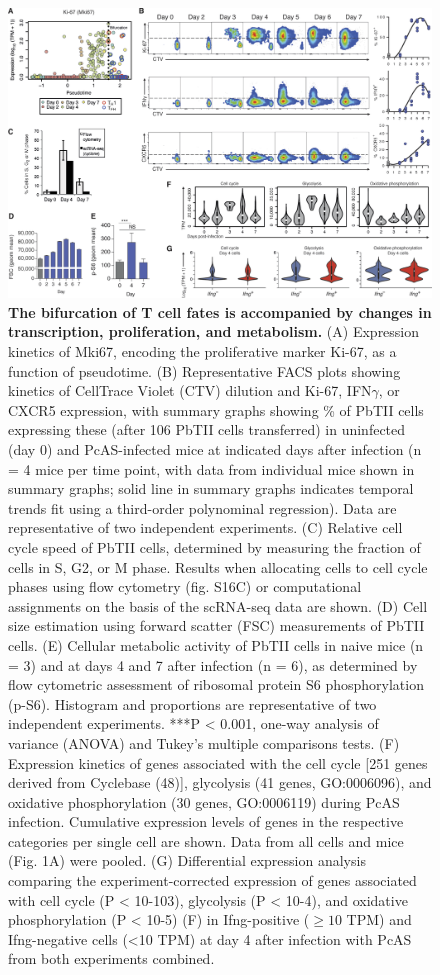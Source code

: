 \begin{figure}
    \centering
    \includegraphics[width=\textwidth]{"Fig4"}
    \caption[The bifurcation of T cell fates is accompanied by changes in transcription, proliferation, and metabolism]{\textbf{The bifurcation of T cell fates is accompanied by changes in transcription, proliferation, and metabolism.} (A) Expression kinetics of Mki67, encoding the proliferative marker Ki-67, as a function of pseudotime. (B) Representative FACS plots showing kinetics of CellTrace Violet (CTV) dilution and Ki-67, IFN\( \gamma \), or CXCR5 expression, with summary graphs showing \% of PbTII cells expressing these (after 106 PbTII cells transferred) in uninfected (day 0) and PcAS-infected mice at indicated days after infection (n = 4 mice per time point, with data from individual mice shown in summary graphs; solid line in summary graphs indicates temporal trends fit using a third-order polynominal regression). Data are representative of two independent experiments. (C) Relative cell cycle speed of PbTII cells, determined by measuring the fraction of cells in S, G2, or M phase. Results when allocating cells to cell cycle phases using flow cytometry (fig. S16C) or computational assignments on the basis of the scRNA-seq data are shown. (D) Cell size estimation using forward scatter (FSC) measurements of PbTII cells. (E) Cellular metabolic activity of PbTII cells in naive mice (n = 3) and at days 4 and 7 after infection (n = 6), as determined by flow cytometric assessment of ribosomal protein S6 phosphorylation (p-S6). Histogram and proportions are representative of two independent experiments. ***P < 0.001, one-way analysis of variance (ANOVA) and Tukey’s multiple comparisons tests. (F) Expression kinetics of genes associated with the cell cycle [251 genes derived from Cyclebase (48)], glycolysis (41 genes, GO:0006096), and oxidative phosphorylation (30 genes, GO:0006119) during PcAS infection. Cumulative expression levels of genes in the respective categories per single cell are shown. Data from all cells and mice (Fig. 1A) were pooled. (G) Differential expression analysis comparing the experiment-corrected expression of genes associated with cell cycle (P < 10-103), glycolysis (P < 10-4), and oxidative phosphorylation (P < 10-5) (F) in Ifng-positive (\( \geq 10 \) TPM) and Ifng-negative cells (<10 TPM) at day 4 after infection with PcAS from both experiments combined.}

\end{figure}
